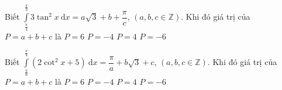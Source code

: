 \begin{ex}%
Biết $\displaystyle\int\limits_{\tfrac{\pi}{4}}^{\tfrac{\pi}{3}}{3\tan^2x\mathrm{~d}x}=a\sqrt{3}+b+\dfrac{\pi}{c}$, $\left(a,b,c\in\mathbb{Z}\right)$. Khi đó giá trị của $ P=a+b+c$ là
\choice
{$ P=6$}
{\True $ P=-4$}
{$ P=4$}
{$ P=-6$}
\end{ex}
%
\begin{ex}%
Biết $\displaystyle\int\limits_{\tfrac{\pi}{6}}^{\tfrac{\pi}{4}}{\left(2\cot^2x+5\right)\mathrm{~d}x}=\dfrac{\pi}{a}+b\sqrt{3}+c$, $\left(a,b,c\in\mathbb{Z}\right)$. Khi đó giá trị của  $ P=a+b+c$ là
\choice
{$ P=6$}
{$ P=-4$}
{\True $ P=4$}
{$ P=-6$}
\end{ex}

